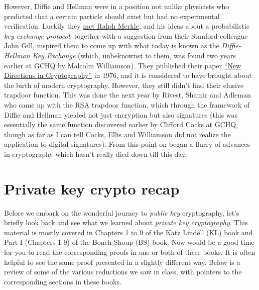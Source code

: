However, Diffie and Hellman were in a position not unlike physicists who
predicted that a certain particle should exist but had no experimental
verification. Luckily they
\href{http://cr.yp.to/bib/1988/diffie.pdf}{met Ralph Merkle}, and his
ideas about a probabilistic \emph{key exchange protocol}, together with
a suggestion from their Stanford colleague
\href{https://profiles.stanford.edu/john-gill}{John Gill}, inspired them
to come up with what today is known as the \emph{Diffie-Hellman Key
Exchange} (which, unbeknownst to them, was found two years earlier at
GCHQ by Malcolm Williamson). They published their paper
\href{https://www-ee.stanford.edu/~hellman/publications/24.pdf}{``New
Directions in Cryptography''} in 1976, and it is considered to have
brought about the birth of modern cryptography. However, they still
didn't find their elusive trapdoor function. This was done the next year
by Rivest, Shamir and Adleman who came up with the RSA trapdoor
function, which through the framework of Diffie and Hellman yielded not
just encryption but also signatures (this was essentially the same
function discovered earlier by Clifford Cocks at GCHQ, though as far as
I can tell Cocks, Ellis and Williamson did not realize the application
to digital signatures). From this point on began a flurry of advances in
cryptography which hasn't really died down till this day.

\section{Private key crypto recap}\label{10-Private-key-crypto-rec}

Before we embark on the wonderful journey to \emph{public key}
cryptography, let's briefly look back and see what we learned about
\emph{private key cryptography}. This material is mostly covered in
Chapters 1 to 9 of the Katz Lindell (KL) book and Part I (Chapters 1-9)
of the Boneh Shoup (BS) book. Now would be a good time for you to read
the corresponding proofs in one or both of these books. It is often
helpful to see the same proof presented in a slightly different way.
Below is a review of some of the various reductions we saw in class,
with pointers to the corresponding sections in these books.


